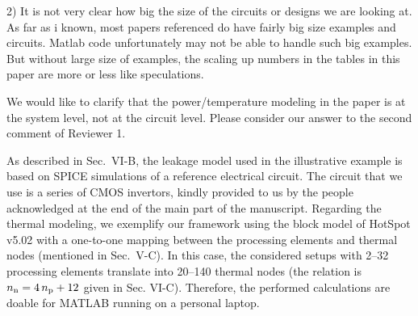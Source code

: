 \begin{reviewer}
2) It is not very clear how big the size of the circuits or designs we are looking at.
As far as i known, most papers referenced do have fairly big size examples and circuits. Matlab code unfortunately may not be able to handle such big examples.
But without large size of examples, the scaling up numbers in the tables in this paper are more or less like speculations.
\end{reviewer}
\begin{authors}
We would like to clarify that the power/temperature modeling in the paper is at the system level, not at the circuit level.
Please consider our answer to the second comment of Reviewer 1.

As described in Sec.~VI-B, the leakage model used in the illustrative example is based on SPICE simulations of a reference electrical circuit.
The circuit that we use is a series of CMOS invertors, kindly provided to us by the people acknowledged at the end of the main part of the manuscript.
Regarding the thermal modeling, we exemplify our framework using the block model of HotSpot v5.02 with a one-to-one mapping between the processing elements and thermal nodes (mentioned in Sec.~V-C).
In this case, the considered setups with 2--32 processing elements translate into 20--140 thermal nodes (the relation is ${n_\text{n}} = 4 \, {n_\text{p}} + 12$ given in Sec. VI-C).
Therefore, the performed calculations are doable for MATLAB running on a personal laptop.

\begin{actions}
\end{actions}
\end{authors}

